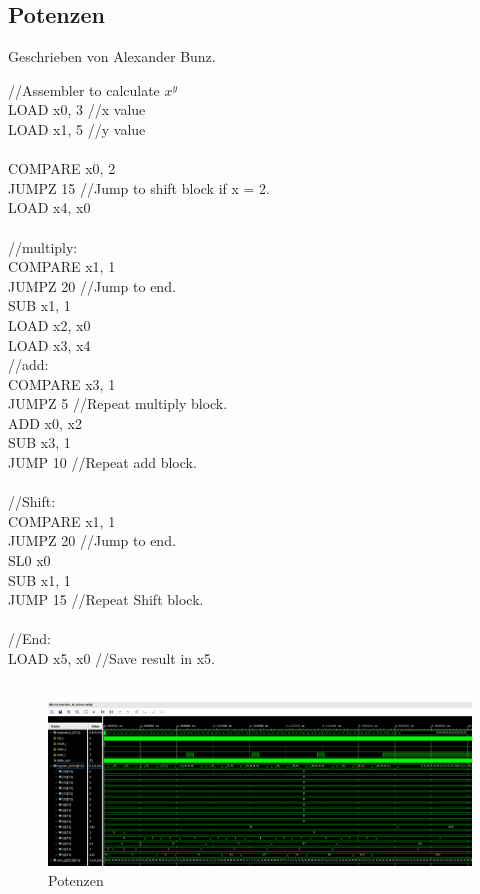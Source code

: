 \documentclass[bibliography=totoc,listof=totoc,index=totoc]{scrartcl}
\begin{document}
\subsection{Potenzen}
Geschrieben von Alexander Bunz.
\begin{small}
\begin{multicols}{2}
//Assembler to calculate $x^y$\\
LOAD x0, 3 //x value\\
LOAD x1, 5 //y value\\
\\
COMPARE x0, 2\\
JUMPZ 15 //Jump to shift block if x = 2.\\
LOAD x4, x0\\
\\
//multiply:\\
COMPARE x1, 1\\
JUMPZ 20 //Jump to end.\\
SUB x1, 1\\
LOAD x2, x0\\
LOAD x3, x4\\
//add:\\
COMPARE x3, 1\\
JUMPZ 5 //Repeat multiply block.\\
ADD x0, x2\\
SUB x3, 1\\
JUMP 10 //Repeat add block.\\
\\
//Shift:\\
COMPARE x1, 1\\
JUMPZ 20 //Jump to end.\\
SL0 x0\\
SUB x1, 1\\
JUMP 15 //Repeat Shift block.\\
\\
//End:\\
LOAD x5, x0 //Save result in x5.\\
\\
\end{multicols}
\end{small}
\begin{figure}[H]
    \centering
    \includegraphics[width=\textwidth]{Potenzen.png}
    \caption{Potenzen}
    \label{fig:Potenzen}
\end{figure}
\end{document}
